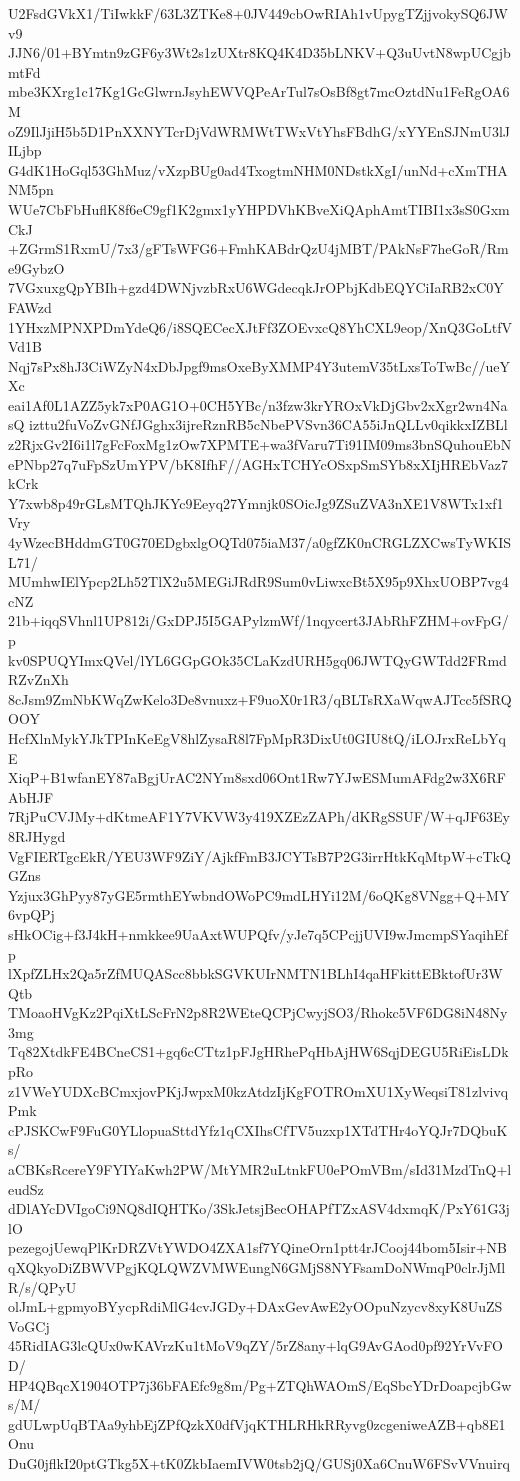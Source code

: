 U2FsdGVkX1/TiIwkkF/63L3ZTKe8+0JV449cbOwRIAh1vUpygTZjjvokySQ6JWv9
JJN6/01+BYmtn9zGF6y3Wt2s1zUXtr8KQ4K4D35bLNKV+Q3uUvtN8wpUCgjbmtFd
mbe3KXrg1c17Kg1GcGlwrnJsyhEWVQPeArTul7sOsBf8gt7mcOztdNu1FeRgOA6M
oZ9IlJjiH5b5D1PnXXNYTcrDjVdWRMWtTWxVtYhsFBdhG/xYYEnSJNmU3lJILjbp
G4dK1HoGql53GhMuz/vXzpBUg0ad4TxogtmNHM0NDstkXgI/unNd+cXmTHANM5pn
WUe7CbFbHuflK8f6eC9gf1K2gmx1yYHPDVhKBveXiQAphAmtTIBI1x3sS0GxmCkJ
+ZGrmS1RxmU/7x3/gFTsWFG6+FmhKABdrQzU4jMBT/PAkNsF7heGoR/Rme9GybzO
7VGxuxgQpYBIh+gzd4DWNjvzbRxU6WGdecqkJrOPbjKdbEQYCiIaRB2xC0YFAWzd
1YHxzMPNXPDmYdeQ6/i8SQECecXJtFf3ZOEvxcQ8YhCXL9eop/XnQ3GoLtfVVd1B
Nqj7sPx8hJ3CiWZyN4xDbJpgf9msOxeByXMMP4Y3utemV35tLxsToTwBc//ueYXc
eai1Af0L1AZZ5yk7xP0AG1O+0CH5YBc/n3fzw3krYROxVkDjGbv2xXgr2wn4NasQ
izttu2fuVoZvGNfJGghx3ijreRznRB5cNbePVSvn36CA55iJnQLLv0qikkxIZBLl
z2RjxGv2I6i1l7gFcFoxMg1zOw7XPMTE+wa3fVaru7Ti91IM09ms3bnSQuhouEbN
ePNbp27q7uFpSzUmYPV/bK8IfhF//AGHxTCHYcOSxpSmSYb8xXIjHREbVaz7kCrk
Y7xwb8p49rGLsMTQhJKYc9Eeyq27Ymnjk0SOicJg9ZSuZVA3nXE1V8WTx1xf1Vry
4yWzecBHddmGT0G70EDgbxlgOQTd075iaM37/a0gfZK0nCRGLZXCwsTyWKISL71/
MUmhwIElYpcp2Lh52TlX2u5MEGiJRdR9Sum0vLiwxcBt5X95p9XhxUOBP7vg4cNZ
21b+iqqSVhnl1UP812i/GxDPJ5I5GAPylzmWf/1nqycert3JAbRhFZHM+ovFpG/p
kv0SPUQYImxQVel/lYL6GGpGOk35CLaKzdURH5gq06JWTQyGWTdd2FRmdRZvZnXh
8cJsm9ZmNbKWqZwKelo3De8vnuxz+F9uoX0r1R3/qBLTsRXaWqwAJTcc5fSRQOOY
HcfXlnMykYJkTPInKeEgV8hlZysaR8l7FpMpR3DixUt0GIU8tQ/iLOJrxReLbYqE
XiqP+B1wfanEY87aBgjUrAC2NYm8sxd06Ont1Rw7YJwESMumAFdg2w3X6RFAbHJF
7RjPuCVJMy+dKtmeAF1Y7VKVW3y419XZEzZAPh/dKRgSSUF/W+qJF63Ey8RJHygd
VgFIERTgcEkR/YEU3WF9ZiY/AjkfFmB3JCYTsB7P2G3irrHtkKqMtpW+cTkQGZns
Yzjux3GhPyy87yGE5rmthEYwbndOWoPC9mdLHYi12M/6oQKg8VNgg+Q+MY6vpQPj
sHkOCig+f3J4kH+nmkkee9UaAxtWUPQfv/yJe7q5CPcjjUVI9wJmcmpSYaqihEfp
lXpfZLHx2Qa5rZfMUQAScc8bbkSGVKUIrNMTN1BLhI4qaHFkittEBktofUr3WQtb
TMoaoHVgKz2PqiXtLScFrN2p8R2WEteQCPjCwyjSO3/Rhokc5VF6DG8iN48Ny3mg
Tq82XtdkFE4BCneCS1+gq6cCTtz1pFJgHRhePqHbAjHW6SqjDEGU5RiEisLDkpRo
z1VWeYUDXcBCmxjovPKjJwpxM0kzAtdzIjKgFOTROmXU1XyWeqsiT81zlvivqPmk
cPJSKCwF9FuG0YLlopuaSttdYfz1qCXIhsCfTV5uzxp1XTdTHr4oYQJr7DQbuKs/
aCBKsRcereY9FYIYaKwh2PW/MtYMR2uLtnkFU0ePOmVBm/sId31MzdTnQ+leudSz
dDlAYcDVIgoCi9NQ8dIQHTKo/3SkJetsjBecOHAPfTZxASV4dxmqK/PxY61G3jlO
pezegojUewqPlKrDRZVtYWDO4ZXA1sf7YQineOrn1ptt4rJCooj44bom5Isir+NB
qXQkyoDiZBWVPgjKQLQWZVMWEungN6GMjS8NYFsamDoNWmqP0clrJjMlR/s/QPyU
olJmL+gpmyoBYycpRdiMlG4cvJGDy+DAxGevAwE2yOOpuNzycv8xyK8UuZSVoGCj
45RidIAG3lcQUx0wKAVrzKu1tMoV9qZY/5rZ8any+lqG9AvGAod0pf92YrVvFOD/
HP4QBqcX1904OTP7j36bFAEfc9g8m/Pg+ZTQhWAOmS/EqSbcYDrDoapcjbGws/M/
gdULwpUqBTAa9yhbEjZPfQzkX0dfVjqKTHLRHkRRyvg0zcgeniweAZB+qb8E1Onu
DuG0jflkI20ptGTkg5X+tK0ZkbIaemIVW0tsb2jQ/GUSj0Xa6CnuW6FSvVVnuirq
